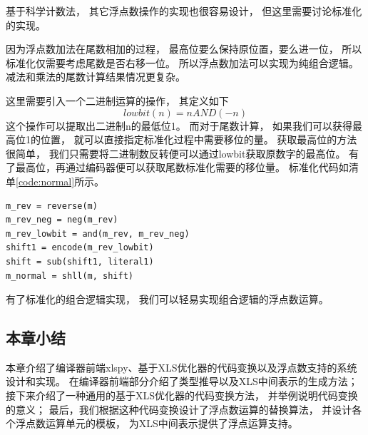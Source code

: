 基于科学计数法，
其它浮点数操作的实现也很容易设计，
但这里需要讨论标准化的实现。

因为浮点数加法在尾数相加的过程，
最高位要么保持原位置，要么进一位，
所以标准化仅需要考虑尾数是否右移一位。
所以浮点数加法可以实现为纯组合逻辑。
减法和乘法的尾数计算结果情况更复杂。

这里需要引入一个二进制运算的操作，
其定义如下
$$lowbit(n) = n AND (-n)$$
这个操作可以提取出二进制n的最低位1。
而对于尾数计算，
如果我们可以获得最高位1的位置，
就可以直接指定标准化过程中需要移位的量。
获取最高位的方法很简单，
我们只需要将二进制数反转便可以通过lowbit获取原数字的最高位。
有了最高位，再通过编码器便可以获取尾数标准化需要的移位量。
标准化代码如清单\ref{code:normal}所示。

\begin{lstlisting}[label=code:normal, caption=浮点数标准化代码, captionpos=b]
m_rev = reverse(m)
m_rev_neg = neg(m_rev)
m_rev_lowbit = and(m_rev, m_rev_neg)
shift1 = encode(m_rev_lowbit)
shift = sub(shift1, literal1)
m_normal = shll(m, shift)
\end{lstlisting}

有了标准化的组合逻辑实现，
我们可以轻易实现组合逻辑的浮点数运算。

\subsection{本章小结}

本章介绍了编译器前端xlspy、基于XLS优化器的代码变换以及浮点数支持的系统设计和实现。
在编译器前端部分介绍了类型推导以及XLS中间表示的生成方法；
接下来介绍了一种通用的基于XLS优化器的代码变换方法，
并举例说明代码变换的意义；
最后，我们根据这种代码变换设计了浮点数运算的替换算法，
并设计各个浮点数运算单元的模板，
为XLS中间表示提供了浮点运算支持。